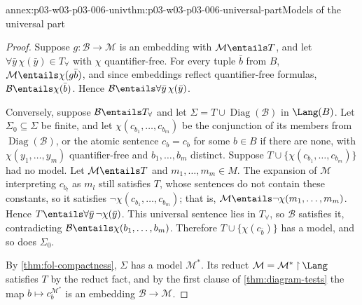 \begin{annexitem}{annex:p03-w03-p03-006-univ}{thm:p03-w03-p03-006-universal-part}{Models of the universal part}
\begin{proof}
Suppose \(g:\mathcal B\to\mathcal M\) is an embedding with
\(\mathcal M\entails T\), and let
\(\forall\bar y\,\chi(\bar y)\in T_\forall\) with \(\chi\)
quantifier-free.  For every tuple \(\bar b\) from \(B\),
\(\mathcal M\entails\chi(g\bar b)\), and since embeddings reflect
quantifier-free formulas, \(\mathcal B\entails\chi(\bar b)\).  Hence
\(\mathcal B\entails\forall\bar y\,\chi(\bar y)\).

Conversely, suppose \(\mathcal B\entails T_\forall\) and let
\(\Sigma=T\cup\operatorname{Diag}(\mathcal B)\) in \(\Lang(B)\).  Let
\(\Sigma_0\subseteq\Sigma\) be finite, and let \(\chi(c_{b_1},\ldots,c_{b_m})\)
be the conjunction of its members from \(\operatorname{Diag}(\mathcal B)\),
or the atomic sentence \(c_b=c_b\) for some \(b\in B\) if there are none,
with \(\chi(y_1,\ldots,y_m)\)
quantifier-free and \(b_1,\ldots,b_m\) distinct.  Suppose
\(T\cup\{\chi(c_{b_1},\ldots,c_{b_m})\}\) had no model.  Let
\(\mathcal M\entails T\) and \(m_1,\ldots,m_m\in M\).  The expansion of
\(\mathcal M\) interpreting \(c_{b_l}\) as \(m_l\) still satisfies \(T\),
whose sentences do not contain these constants, so it satisfies
\(\neg\chi(c_{b_1},\ldots,c_{b_m})\); that is,
\(\mathcal M\entails\neg\chi(m_1,\ldots,m_m)\).  Hence
\(T\entails\forall\bar y\,\neg\chi(\bar y)\).  This universal sentence lies
in \(T_\forall\), so \(\mathcal B\) satisfies it, contradicting
\(\mathcal B\entails\chi(b_1,\ldots,b_m)\).  Therefore
\(T\cup\{\chi(c_{\bar b})\}\) has a model, and so does \(\Sigma_0\).

By \cref{thm:fol-compactness}, \(\Sigma\) has a model \(\mathcal M^*\).
Its reduct \(\mathcal M=\mathcal M^*\mathbin{\upharpoonright}\Lang\)
satisfies \(T\) by the reduct fact, and by the first clause of
\cref{thm:diagram-tests} the map \(b\mapsto c_b^{\mathcal M^*}\) is an
embedding \(\mathcal B\to\mathcal M\).
\end{proof}
\end{annexitem}


